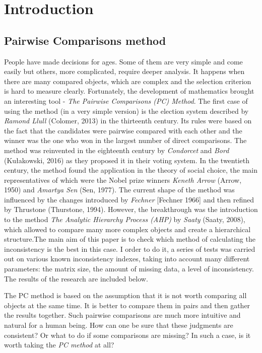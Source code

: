 \chapter{Introduction}
\label{cha:wprowadzenie}


\section{Pairwise Comparisons method}
\label{sec:metodaPorowan}
People have made decisions for ages. Some of them are very simple and come easily but others, more complicated, require deeper analysis. It happens when there are many compared objects, which are complex and the selection criterion is hard to measure clearly. Fortunately, the development of mathematics brought an interesting tool - \textit{The Pairwise Comparisons (PC) Method}. The first case of using the method (in a very simple version) is the election system described by \textit{Ramond Llull} (Colomer, 2013) in the thirteenth century. Its rules were based on the fact that the candidates were pairwise compared with each other and the winner was the one who won in the largest number of direct comparisons. The method was reinvented in the eighteenth century by \textit{Condorcet} and \textit{Bord} (Kułakowski, 2016) as they proposed it in their voting system. In the twentieth century, the method found the application in the theory of social choice, the main representatives of which were the Nobel prize winners \textit{Keneth Arrow} (Arrow, 1950) and \textit{Amartya Sen} (Sen, 1977). The current shape of the method was influenced by the changes introduced by \textit{Fechner} [Fechner 1966] and then refined by {Thrustone} (Thurstone, 1994). However, the breakthrough was the introduction to the method \textit\textit{The Analytic Hierarchy Process (AHP)} by \textit{Saaty} (Saaty, 2008), which allowed to compare many more complex objects and create a hierarchical structure.The main aim of this paper is to check which method of calculating the inconsistency is the best in this case. I order to do it, a series of tests was carried out on various known inconsistency indexes, taking into account many different parameters: the matrix size, the amount of missing data, a level of inconsistency. The results of the research are included below.

The PC method is based on the assumption that it is not worth comparing all objects at the same time. It is better to compare them in pairs and then gather the results together. Such pairwise comparisons are much more intuitive and natural for a human being. How can one be sure that these judgments are consistent? Or what to do if some comparisons are missing? In such a case, is it worth taking the \textit{PC method} at all?

